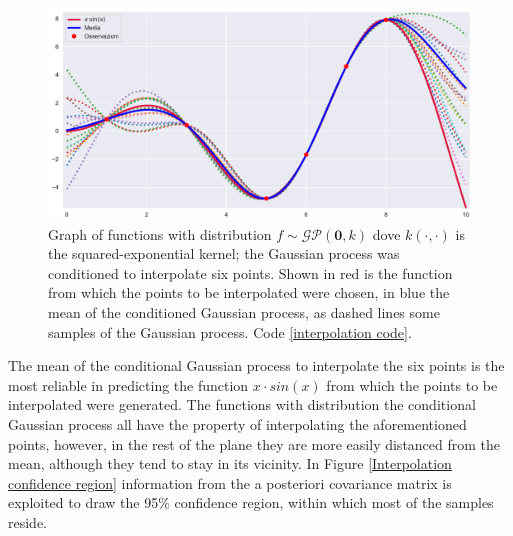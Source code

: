 \begin{figure}[h]
    \centering
    \includegraphics[width=1\textwidth]{images/Gaussian process/Noise-free - mean&f(x).pdf}
    \caption{Graph of functions with distribution $f\sim \mathcal{GP}(\bm{0},k)$ dove $k(\cdot,\cdot)$ is the squared-exponential kernel; the Gaussian process was conditioned to interpolate six points. Shown in red is the function from which the points to be interpolated were chosen, in blue the mean of the conditioned Gaussian process, as dashed lines some samples of the Gaussian process. Code \ref{interpolation code}.}
    \label{Interpolation}
\end{figure}

The mean of the conditional Gaussian process to interpolate the six points is the most reliable in predicting the function $x\cdot sin(x)$ from which the points to be interpolated were generated. The functions with distribution the conditional Gaussian process all have the property of interpolating the aforementioned points, however, in the rest of the plane they are more easily distanced from the mean, although they tend to stay in its vicinity. In Figure \ref{Interpolation confidence region} information from the a posteriori covariance matrix is exploited to draw the 95\% confidence region, within which most of the samples reside.


